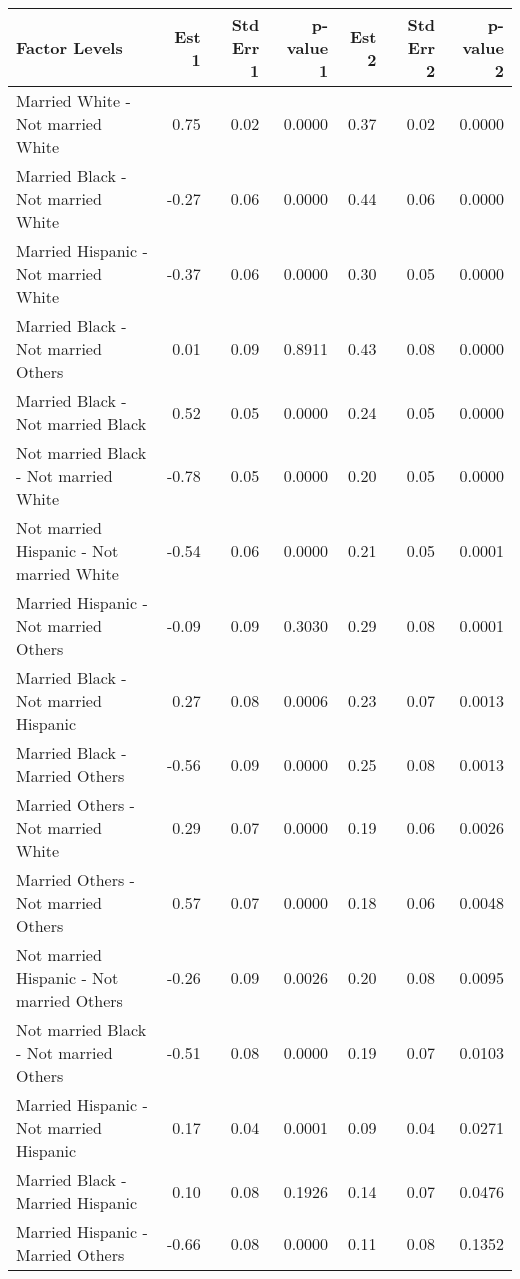 \documentclass[11pt]{extarticle} %
\begin{document}
\begin{table}[ht]
\footnotesize
\centering
\begin{tabular}{lrrrrrr}
  \hline
Factor Levels & Est 1 & Std Err 1 & p-value 1 & Est 2 & Std Err 2 & p-value 2 \\ 
  \hline
  Married White -  Not married White & 0.75 & 0.02 & 0.0000 & 0.37 & 0.02 & 0.0000 \\ 
    Married Black -  Not married White & -0.27 & 0.06 & 0.0000 & 0.44 & 0.06 & 0.0000 \\ 
    Married Hispanic -  Not married White & -0.37 & 0.06 & 0.0000 & 0.30 & 0.05 & 0.0000 \\ 
    Married Black -  Not married Others & 0.01 & 0.09 & 0.8911 & 0.43 & 0.08 & 0.0000 \\ 
    Married Black -  Not married Black & 0.52 & 0.05 & 0.0000 & 0.24 & 0.05 & 0.0000 \\ 
    Not married Black -  Not married White & -0.78 & 0.05 & 0.0000 & 0.20 & 0.05 & 0.0000 \\ 
    Not married Hispanic -  Not married White & -0.54 & 0.06 & 0.0000 & 0.21 & 0.05 & 0.0001 \\ 
    Married Hispanic -  Not married Others & -0.09 & 0.09 & 0.3030 & 0.29 & 0.08 & 0.0001 \\ 
    Married Black -  Not married Hispanic & 0.27 & 0.08 & 0.0006 & 0.23 & 0.07 & 0.0013 \\ 
    Married Black -  Married Others & -0.56 & 0.09 & 0.0000 & 0.25 & 0.08 & 0.0013 \\ 
    Married Others -  Not married White & 0.29 & 0.07 & 0.0000 & 0.19 & 0.06 & 0.0026 \\ 
    Married Others -  Not married Others & 0.57 & 0.07 & 0.0000 & 0.18 & 0.06 & 0.0048 \\ 
    Not married Hispanic -  Not married Others & -0.26 & 0.09 & 0.0026 & 0.20 & 0.08 & 0.0095 \\ 
    Not married Black -  Not married Others & -0.51 & 0.08 & 0.0000 & 0.19 & 0.07 & 0.0103 \\ 
    Married Hispanic -  Not married Hispanic & 0.17 & 0.04 & 0.0001 & 0.09 & 0.04 & 0.0271 \\ 
    Married Black -  Married Hispanic & 0.10 & 0.08 & 0.1926 & 0.14 & 0.07 & 0.0476 \\ 
    Married Hispanic -  Married Others & -0.66 & 0.08 & 0.0000 & 0.11 & 0.08 & 0.1352 \\ 

\end{tabular}
\end{table}
\end{document}
